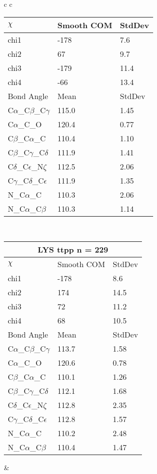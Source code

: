 \begin{longtable}{ c c }
\begin{tabular}{ l l l }
  $\chi$       & Smooth COM & StdDev \\ \midrule
  chi1 & -178 & 7.6 \\ 
  chi2 & 67 & 9.7 \\ 
  chi3 & -179 & 11.4 \\ 
  chi4 & -66 & 13.4 \\ \midrule
  Bond Angle   & Mean     & StdDev \\ \midrule
  C$\alpha$\_C$\beta$\_C$\gamma$ & 115.0 & 1.45\\
  C$\alpha$\_C\_O & 120.4 & 0.77\\
  C$\beta$\_C$\alpha$\_C & 110.4 & 1.10\\
  C$\beta$\_C$\gamma$\_C$\delta$ & 111.9 & 1.41\\
  C$\delta$\_C$\epsilon$\_N$\zeta$ & 112.5 & 2.06\\
  C$\gamma$\_C$\delta$\_C$\epsilon$ & 111.9 & 1.35\\
  N\_C$\alpha$\_C & 110.3 & 2.06\\
  N\_C$\alpha$\_C$\beta$ & 110.3 & 1.14\\
  \bottomrule
  \end{tabular}
  \\
  \begin{tabular}{ l l l }
  \toprule
  \multicolumn{3}{c}{LYS \textbf{ttpp} n = 229} \\ \toprule
  $\chi$       & Smooth COM & StdDev \\ \midrule
  chi1 & -178 & 8.6 \\ 
  chi2 & 174 & 14.5 \\ 
  chi3 & 72 & 11.2 \\ 
  chi4 & 68 & 10.5 \\ \midrule
  Bond Angle   & Mean     & StdDev \\ \midrule
  C$\alpha$\_C$\beta$\_C$\gamma$ & 113.7 & 1.58\\
  C$\alpha$\_C\_O & 120.6 & 0.78\\
  C$\beta$\_C$\alpha$\_C & 110.1 & 1.26\\
  C$\beta$\_C$\gamma$\_C$\delta$ & 112.1 & 1.68\\
  C$\delta$\_C$\epsilon$\_N$\zeta$ & 112.8 & 2.35\\
  C$\gamma$\_C$\delta$\_C$\epsilon$ & 112.8 & 1.57\\
  N\_C$\alpha$\_C & 110.2 & 2.48\\
  N\_C$\alpha$\_C$\beta$ & 110.4 & 1.47\\
  \bottomrule
  \end{tabular}
  &

\end{longtable}
